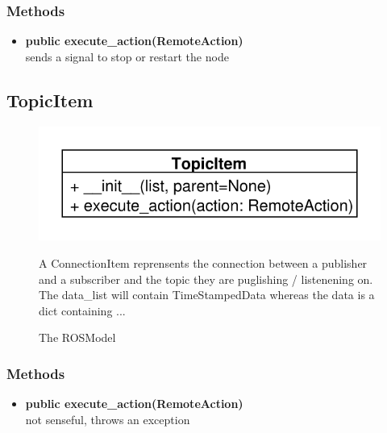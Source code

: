 \subsubsection{Methods}
\begin{itemize}
  \item \textbf{public execute\_action(RemoteAction)}\\
  sends a signal to stop or restart the node
\end{itemize}

\subsection{TopicItem}
\begin{figure}[htbp]
	\begin{minipage}[t]{7cm}
		\vspace{0pt}
		\centering
		\includegraphics[scale=0.6]{./diagram_pictures/TopicItem.pdf}
		\caption{The ROSModel}
	\end{minipage}
	\hfill
	\begin{minipage}[t]{8cm}
		\vspace{10pt}
		A ConnectionItem reprensents the connection between a publisher and a
		subscriber and the topic they are puglishing / listenening on.
		The data\_list will contain TimeStampedData whereas the data is a dict
		containing ...
	\end{minipage}
\end{figure} 
\subsubsection{Methods}
\begin{itemize}
  \item \textbf{public execute\_action(RemoteAction)}\\ 
  not senseful, throws an exception
\end{itemize}


